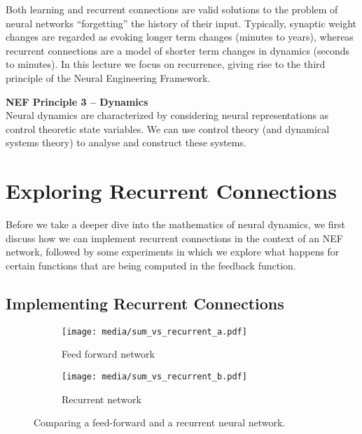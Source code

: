 \documentclass[10pt,letterpaper,oneside]{article}
\begin{document}
Both learning and recurrent connections are valid solutions to the problem of neural networks \enquote{forgetting} the history of their input. Typically, synaptic weight changes are regarded as evoking longer term changes (minutes to years), whereas recurrent connections are a model of shorter term changes in dynamics (seconds to minutes). In this lecture we focus on recurrence, giving rise to the third principle of the Neural Engineering Framework.

\begin{mdframed}
	\textbf{NEF Principle 3 -- Dynamics}\\
	Neural dynamics are characterized by considering neural representations as control theoretic state variables. We can use control theory (and dynamical systems theory) to analyse and construct these systems.
\end{mdframed}

\section{Exploring Recurrent Connections}

Before we take a deeper dive into the mathematics of neural dynamics, we first discuss how we can implement recurrent connections in the context of an NEF network, followed by some experiments in which we explore what happens for certain functions that are being computed in the feedback function.

\subsection{Implementing Recurrent Connections}

\begin{figure}[h]
	\begin{subfigure}[b]{0.6\textwidth}
		\centering
		\texttt{[image: media/sum\_vs\_recurrent\_a.pdf]}
		\caption{Feed forward network}
		\label{fig:feed_forward_recurrent_a}
	\end{subfigure}
	\begin{subfigure}[b]{0.4\textwidth}
		\centering
		\texttt{[image: media/sum\_vs\_recurrent\_b.pdf]}
		\caption{Recurrent network}
		\label{fig:feed_forward_recurrent_b}
	\end{subfigure}
	\caption{Comparing a feed-forward and a recurrent neural network.}
	\label{fig:feed_forward_recurrent}
\end{figure}

\end{document}
